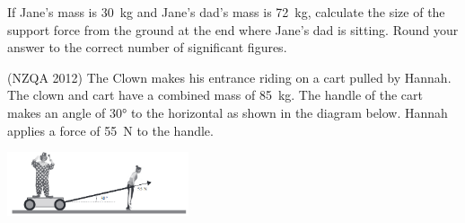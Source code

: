 \documentclass[a4paper]{exam}
\begin{document}
\begin{questions}
\begin{parts}
              If Jane's mass is \SI{30}{\kilo\gram} and Jane's dad's mass is \SI{72}{\kilo\gram}, calculate the
              size of the support force from the ground at the end where Jane's dad is sitting. Round your answer
              to the correct number of significant figures.
      \end{parts}
    \question (NZQA 2012) The Clown makes his entrance riding on a cart pulled by Hannah. The clown and cart have a
              combined mass of \SI{85}{\kilo\gram}. The handle of the cart makes an angle of \ang{30} to the horizontal
              as shown in the diagram below. Hannah applies a force of \SI{55}{\newton} to the handle.

              \includegraphics[width=0.4\textwidth]{nzqa20122}

\end{questions}
\end{document}
